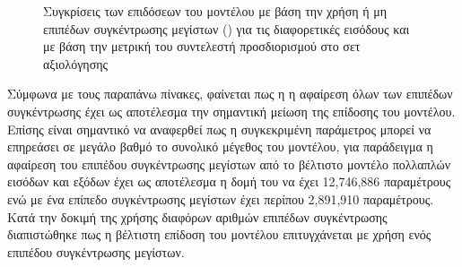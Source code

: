 \begin{figure}[H]
    \caption{Συγκρίσεις των επιδόσεων του μοντέλου με βάση την χρήση ή μη επιπέδων συγκέντρωσης μεγίστων () για τις διαφορετικές εισόδους  και  με βάση την μετρική του συντελεστή προσδιορισμού στο σετ αξιολόγησης}
\end{figure}

Σύμφωνα με τους παραπάνω πίνακες, φαίνεται πως η η αφαίρεση όλων των επιπέδων συγκέντρωσης έχει ως αποτέλεσμα την σημαντική μείωση της επίδοσης του μοντέλου. Επίσης είναι σημαντικό να αναφερθεί πως η συγκεκριμένη παράμετρος μπορεί να επηρεάσει σε μεγάλο βαθμό το συνολικό μέγεθος του μοντέλου, για παράδειγμα η αφαίρεση του επιπέδου συγκέντρωσης μεγίστων από το βέλτιστο μοντέλο πολλαπλών εισόδων και εξόδων έχει ως αποτέλεσμα η δομή του να έχει 12,746,886 παραμέτρους ενώ με ένα επίπεδο συγκέντρωσης μεγίστων έχει περίπου 2,891,910 παραμέτρους. Κατά την δοκιμή της χρήσης διαφόρων αριθμών επιπέδων συγκέντρωσης διαπιστώθηκε πως η βέλτιστη επίδοση του μοντέλου επιτυγχάνεται με χρήση ενός επιπέδου συγκέντρωσης μεγίστων.

